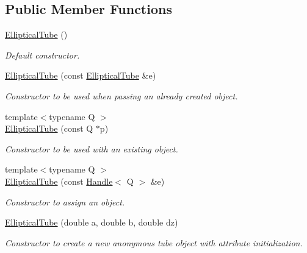 \subsection*{Public Member Functions}
\begin{DoxyCompactItemize}
\item 
\hyperlink{class_d_d4hep_1_1_geometry_1_1_elliptical_tube_a0a8ef871e88153ec8d4300db25e31a66}{EllipticalTube} ()
\begin{DoxyCompactList}\small\item\em Default constructor. \item\end{DoxyCompactList}\item 
\hyperlink{class_d_d4hep_1_1_geometry_1_1_elliptical_tube_a13ceb98edf7cd632d06fe9e72cc46f29}{EllipticalTube} (const \hyperlink{class_d_d4hep_1_1_geometry_1_1_elliptical_tube}{EllipticalTube} \&e)
\begin{DoxyCompactList}\small\item\em Constructor to be used when passing an already created object. \item\end{DoxyCompactList}\item 
{\footnotesize template$<$typename Q $>$ }\\\hyperlink{class_d_d4hep_1_1_geometry_1_1_elliptical_tube_a5d1ad2dab1eddc355b8cbcac55aff2fa}{EllipticalTube} (const Q $\ast$p)
\begin{DoxyCompactList}\small\item\em Constructor to be used with an existing object. \item\end{DoxyCompactList}\item 
{\footnotesize template$<$typename Q $>$ }\\\hyperlink{class_d_d4hep_1_1_geometry_1_1_elliptical_tube_a71d2a63b36daadf5777e12a5998f4c6e}{EllipticalTube} (const \hyperlink{class_d_d4hep_1_1_handle}{Handle}$<$ Q $>$ \&e)
\begin{DoxyCompactList}\small\item\em Constructor to assign an object. \item\end{DoxyCompactList}\item 
\hyperlink{class_d_d4hep_1_1_geometry_1_1_elliptical_tube_a4f6811e402eace05bb1640b8d2e50d48}{EllipticalTube} (double a, double b, double dz)
\begin{DoxyCompactList}\small\item\em Constructor to create a new anonymous tube object with attribute initialization. \item\end{DoxyCompactList}\item 

\end{DoxyCompactItemize}
